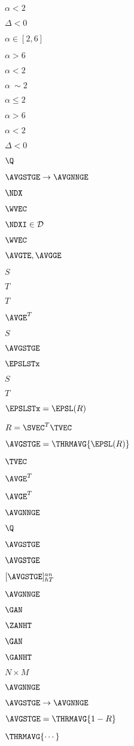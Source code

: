 $\alpha<2$

$\Delta < 0$

$\alpha\in[2,6]$

$\alpha>6$

$\alpha <2$

$\alpha~\sim2$

$\alpha\le 2$

$\alpha>6$

$\alpha<2$

$\Delta < 0$


$\Q$

$\AVGSTGE\rightarrow\AVGNNGE$


$\NDX$

$\WVEC$

$\NDXI\in\mathcal{D}$

$\WVEC$

$\AVGTE, \AVGGE$

$S$

$T$

$T$

$\AVGE^{T}$

$S$

$\AVGSTGE$

$\EPSLSTx$

$S$

$T$

$\EPSLSTx=\EPSL(R)$

$R=\SVEC^{T}\TVEC$

$\AVGSTGE=\THRMAVG{\EPSL(R)}$

$\TVEC$

$\AVGE^{T}$

$\AVGE^{T}$

$\AVGNNGE$

$\Q$

$\AVGSTGE$

$\AVGSTGE$

$[\AVGSTGE]^{an}_{hT}$

$\AVGNNGE$

$\GAN$

$\ZANHT$

$\GAN$

$\GANHT$

$N\times M$

$\AVGNNGE$

$\AVGSTGE\rightarrow\AVGNNGE$

$\AVGSTGE=\THRMAVG{1-R}$

$\THRMAVG{\cdots}$

